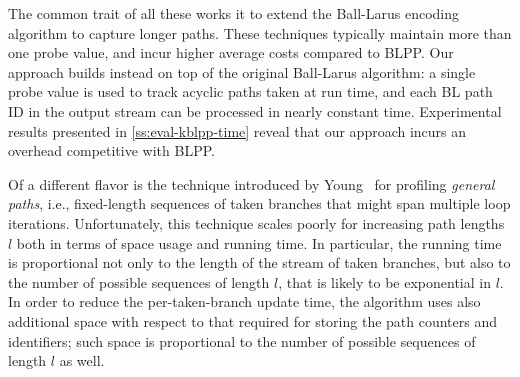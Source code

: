 The common trait of all these works it to extend the Ball-Larus encoding algorithm to capture longer paths. These techniques typically maintain more than one probe value, and incur higher average costs compared to BLPP. Our approach builds instead on top of the original Ball-Larus algorithm: a single probe value is used to track acyclic paths taken at run time, and each BL path ID in the output stream can be processed in nearly constant time. Experimental results presented in \mysection\ref{ss:eval-kblpp-time} reveal that our approach incurs an overhead competitive with BLPP.


Of a different flavor is the technique introduced by Young~\cite{Young98thesis} for profiling {\em general paths}, i.e., fixed-length sequences of taken branches that might span multiple loop iterations.
Unfortunately, this technique scales poorly for increasing path lengths $l$ both in terms of space usage and running time. In particular, the running time is proportional not only to the length of the stream of taken branches, but also to the number of possible sequences of length $l$, that is likely to be exponential in $l$. In order to reduce the per-taken-branch update time, the algorithm uses also additional space with respect to that required for storing the path counters and identifiers; such space is proportional to the number of possible sequences of length $l$ as well.
